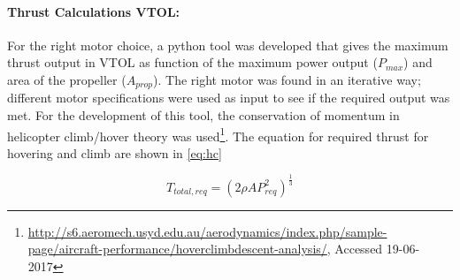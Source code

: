 \begin{comment}
For analysis

show a pitch of 14 inch is needed. The approximated flight speed of this propeller with the max. RPM is:

\begin{equation*}
    14*0.0254* \frac{9302}{60} = 55.13 m/s
\end{equation*}

A propeller with this propeller in combination with this RPM will enable the UAV flight the required 200km/h.

\end{comment}















































\paragraph{Thrust Calculations VTOL:} For the right motor choice, a python tool was developed that gives the maximum thrust output in VTOL as function of the maximum power output ($P_{max}$) and area of the propeller ($A_{prop}$). The right motor was found in an iterative way; different motor specifications were used as input to see if the required output was met. For the development of this tool, the conservation of momentum in helicopter climb/hover theory was used\footnote{\url{http://s6.aeromech.usyd.edu.au/aerodynamics/index.php/sample-page/aircraft-performance/hoverclimbdescent-analysis/}, Accessed 19-06-2017}. The equation for required thrust for hovering and climb are shown in \autoref{eq:hc}

\begin{equation}
\label{eq:hc}
    T_{total,req} = (2 \rho A P_{req}^{2})^{\frac{1}{3}}
\end{equation}

